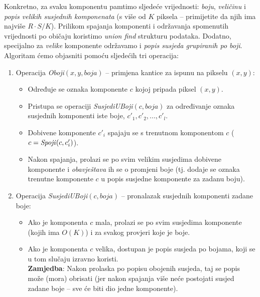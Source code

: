 Konkretno, za svaku komponentu pamtimo sljedeće vrijednosti: \textit{boju},
\textit{veličinu} i \textit{popis velikih susjednih komponenata} (s više od $K$
piksela -- primijetite da njih ima najviše $R \cdot S / K$). Prilikom spajanja
komponenti i održavanja spomenutih vrijednosti po običaju koristimo
\textit{union find} strukturu podataka. Dodatno, specijalno za \textit{velike}
komponente održavamo i \textit{popis susjeda grupiranih po boji}. Algoritam ćemo
objasniti pomoću sljedećih tri operacija:
\begin{enumerate}
  \item Operacija \textit{Oboji}$(x, y, boja)$ -- primjena kantice za ispunu
    na pikselu $(x, y)$:
    \begin{itemize}[topsep=0pt]
      \item Određuje se oznaka komponente $c$ kojoj pripada piksel $(x, y)$.
      \item Pristupa se operaciji \textit{SusjediUBoji}$(c, boja)$ za određivanje
        oznaka susjednih komponenti iste boje, $c'_1, c'_2, ..., c'_l$.
      \item Dobivene komponente $c'_i$ spajaju se s trenutnom komponentom $c$
        ($c = \textrm{\textit{Spoji}}(c, c'_i)$).
      \item Nakon spajanja, prolazi se po svim velikim susjedima dobivene
        komponente i \textit{obavještava} ih se o promjeni boje (tj. dodaje se
        oznaka trenutne komponente $c$ u popis susjedne komponente za zadanu boju).
    \end{itemize}

  \item Operacija \textit{SusjediUBoji}$(c, boja)$ -- pronalazak susjednih
    komponenti zadane boje:
    \begin{itemize}[topsep=0pt]
      \item Ako je komponenta $c$ mala, prolazi se po svim susjedima
        komponente (kojih ima $O(K)$) i za svakog provjeri koje je boje.
      \item Ako je komponenta $c$ velika, dostupan je popis susjeda po bojama,
        koji se u tom slučaju izravno koristi. \\
        \textbf{Zamjedba}: Nakon prolaska po popisu obojenih susjeda, taj se
        popis može (mora) obrisati (jer nakon spajanja više neće postojati susjed
        zadane boje -- sve će biti dio jedne komponente).
    \end{itemize}


\end{enumerate}
